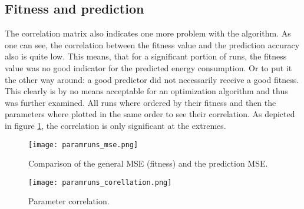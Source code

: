 \documentclass[conference]{IEEEtran}
\begin{document}
\subsection{Fitness and prediction}
\label{sec:fitness_prediction}
The correlation matrix also indicates one more problem with the algorithm. As one can see, the correlation between the fitness value and the prediction accuracy also is quite low. This means, that for a significant portion of runs, the fitness value was no good indicator for the predicted energy consumption. Or to put it the other way around: a good predictor did not necessarily receive a good fitness.\\
This clearly is by no means acceptable for an optimization algorithm and thus was further examined. All runs where ordered by their fitness and then the parameters where plotted in the same order to see their correlation. As depicted in figure \ref{fig:mse_comparison}, the correlation is only significant at the extremes.

\begin{figure}[!t] 
\centering 
\texttt{[image: paramruns\_mse.png]} 
\caption{Comparison of the general MSE (fitness) and the prediction MSE.} 
\label{fig:mse_comparison} 
\end{figure}

\begin{figure}[!t] 
\centering 
\texttt{[image: paramruns\_corellation.png]} 
\caption{Parameter correlation.} 
\label{fig:param_correlation} 
\end{figure}

\end{document}
